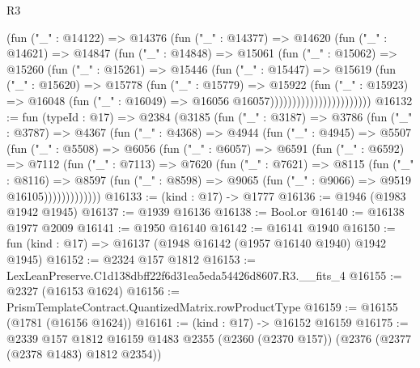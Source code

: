 \begin{lexlean}{R3}
\begin{coremodule}
                            (fun ("_" : @14122) =>
                            @14376
                              (fun ("_" : @14377) =>
                              @14620
                                (fun ("_" : @14621) =>
                                @14847
                                  (fun ("_" : @14848) =>
                                  @15061
                                    (fun ("_" : @15062) =>
                                    @15260
                                      (fun ("_" : @15261) =>
                                      @15446
                                        (fun ("_" : @15447) =>
                                        @15619
                                          (fun ("_" : @15620) =>
                                          @15778
                                            (fun ("_" : @15779) =>
                                            @15922
                                              (fun ("_" : @15923) =>
                                              @16048
                                                (fun ("_" : @16049) =>
                                                @16056 @16057)))))))))))))))))))))))
@16132 := fun (typeId : @17) =>
  @2384
    (@3185
      (fun ("_" : @3187) =>
      @3786
        (fun ("_" : @3787) =>
        @4367
          (fun ("_" : @4368) =>
          @4944
            (fun ("_" : @4945) =>
            @5507
              (fun ("_" : @5508) =>
              @6056
                (fun ("_" : @6057) =>
                @6591
                  (fun ("_" : @6592) =>
                  @7112
                    (fun ("_" : @7113) =>
                    @7620
                      (fun ("_" : @7621) =>
                      @8115
                        (fun ("_" : @8116) =>
                        @8597
                          (fun ("_" : @8598) =>
                          @9065 (fun ("_" : @9066) => @9519 @16105)))))))))))))
@16133 := (kind : @17) -> @1777
@16136 := @1946 (@1983 @1942 @1945)
@16137 := @1939 @16136
@16138 := Bool.or
@16140 := @16138 @1977 @2009
@16141 := @1950 @16140
@16142 := @16141 @1940
@16150 := fun (kind : @17) => @16137 (@1948 @16142 (@1957 @16140 @1940) @1942 @1945)
@16152 := @2324 @157 @1812
@16153 := LexLeanPreserve.C1d138dbff22f6d31ea5eda54426d8607.R3.__fits_4
@16155 := @2327 (@16153 @1624)
@16156 := PrismTemplateContract.QuantizedMatrix.rowProductType
@16159 := @16155 (@1781 (@16156 @1624))
@16161 := (kind : @17) -> @16152 @16159
@16175 := @2339
    @157
    @1812
    @16159
    @1483
    @2355
    (@2360 (@2370 @157))
    (@2376 (@2377 (@2378 @1483) @1812 @2354))

\end{coremodule}
\end{lexlean}
